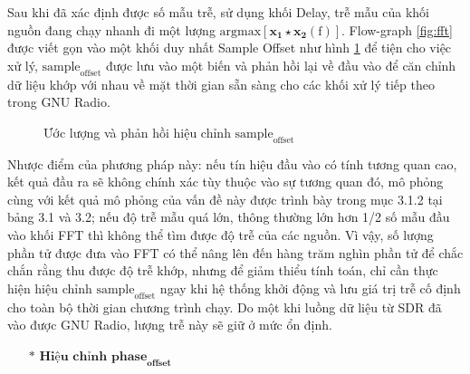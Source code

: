 Sau khi đã xác định được số mẫu trễ, sử dụng khối Delay, trễ mẫu của khối nguồn đang chạy nhanh đi một lượng $\mathrm{argmax[\mathbf{x_1 \star x_2}(f)]}$.  Flow-graph \ref{fig:fft} được viết gọn vào một khối duy nhất Sample Offset như hình \ref{fig:sample_offset} để tiện cho việc xử lý, $\textrm{sample}_\textrm{offset}$ được lưu vào một biến và phản hồi lại về đầu vào để  căn chỉnh dữ liệu khớp với nhau về mặt thời gian sẵn sàng cho các  khối xử lý tiếp theo trong GNU Radio.

\begin{figure}[!h]
{}
\hfill
{}
\hfill
\caption{Ước lượng và phản hồi hiệu chỉnh $\textrm{sample}_\textrm{offset}$}
\label{fig:sample_offset}
\end{figure}

Nhược điểm của phương pháp này: nếu tín hiệu đầu vào có tính tương quan cao, kết quả đầu ra sẽ không chính xác tùy thuộc vào sự tương quan đó, mô phỏng cùng với kết quả mô phỏng của vấn đề này được trình bày trong mục 3.1.2 tại bảng 3.1 và 3.2; nếu độ trễ mẫu quá lớn, thông thường lớn hơn 1/2 số mẫu đầu vào khối FFT thì không thể tìm được độ trễ của các nguồn. Vì vậy, số lượng phần tử được đưa vào FFT có thể nâng lên đến hàng trăm nghìn phần tử để chắc chắn rằng thu được độ trễ khớp, nhưng để giảm thiểu tính toán, chỉ cần thực hiện hiệu chỉnh $\textrm{sample}_\textrm{offset}$ ngay khi hệ thống khởi động và lưu giá trị trễ cố định cho toàn bộ thời gian chương trình chạy. Do một khi luồng dữ liệu từ SDR đã vào được GNU Radio, lượng trễ này sẽ giữ ở mức ổn định.

\begin{itemize}
	\item[$\ast$] \textbf{$\textbf{Hiệu chỉnh } \textbf{phase}_\textbf{offset}$}
\end{itemize} 


